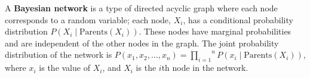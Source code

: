 \begin{definition}
    A \textbf{Bayesian network} is a type of directed acyclic graph where each node corresponds to a random variable; each node, $X_{i}$, has a conditional probability distribution $P(X_{i} \mid \text{Parents}(X_{i}))$. These nodes have marginal probabilities and are independent of the other nodes in the graph. The joint probability distribution of the network is $P(x_{1}, x_{2}, \ldots, x_{n}) = \overset{n}{\underset{i=1}{\prod}} P(x_{i} \mid \text{Parents}(X_{i}))$, where $x_{i}$ is the value of $X_{i}$, and $X_{i}$ is the $i$th node in the network.
\end{definition}





\newpage